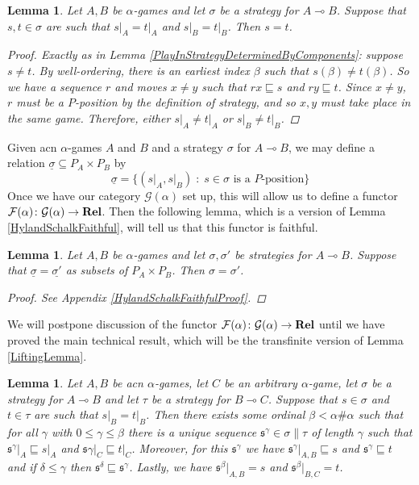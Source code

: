 \documentclass[11pt]{article} %
\theoremstyle{plain} %
\newtheorem{lemma}[theorem]{Lemma}
\theoremstyle{definition} %
\theoremstyle{note}
\theoremstyle{exercisestyle}
\newcommand{\catname}[1]{{\normalfont\textbf{#1}}}
\newcommand{\Rel}{\catname{Rel}}
\newcommand*\from{\colon}
\newcommand{\cmap}[3]{#1\from{}#2\to{}#3}
\renewcommand{\implies}{\multimap}
\newcommand{\G}{\mathcal G}
\newcommand{\suchthat}{\;\colon\;}
\newcommand{\F}{\mathcal F}
\newcommand{\s}{\mathfrak s}
\newcommand{\prefix}{\sqsubseteq}
\newcommand{\grel}[1]{\underline{#1}}
\renewcommand{\subset}{\subseteq}
\begin{document}
\begin{lemma}
  \label{TransPlayInStrategyDeterminedByComponents}
  Let $A,B$ be $\alpha$-games and let $\sigma$ be a strategy for $A\implies B$.  Suppose that $s,t\in\sigma$ are such that $s\vert_A=t\vert_A$ and $s\vert_B=t\vert_B$.  Then $s=t$.
  \begin{proof}
    Exactly as in Lemma \ref{PlayInStrategyDeterminedByComponents}: suppose $s\ne t$.  By well-ordering, there is an earliest index $\beta$ such that $s(\beta)\ne t(\beta)$.  So we have a sequence $r$ and moves $x\ne y$ such that $rx\prefix s$ and $ry\prefix t$.  Since $x\ne y$, $r$ must be a $P$-position by the definition of strategy, and so $x,y$ must take place in the same game.  Therefore, either $s\vert_A\ne t\vert_A$ or $s\vert_B\ne t\vert_B$.
  \end{proof}
\end{lemma}

Given acn $\alpha$-games $A$ and $B$ and a strategy $\sigma$ for $A\implies B$, we may define a relation $\grel\sigma\subset P_A\times P_B$ by
\[
  \grel\sigma = \{(s\vert_A,s\vert_B)\suchthat\textrm{$s\in\sigma$ is a $P$-position}\}
  \]
Once we have our category $\G(\alpha)$ set up, this will allow us to define a functor $\cmap{\F(\alpha)}{\G(\alpha)}{\Rel}$.  Then the following lemma, which is a version of Lemma \ref{HylandSchalkFaithful}, will tell us that this functor is faithful.

\begin{lemma}
  \label{TransHylandSchalkFaithful}
  Let $A,B$ be $\alpha$-games and let $\sigma,\sigma'$ be strategies for $A\implies B$.  Suppose that $\grel\sigma=\grel{\sigma'}$ as subsets of $P_A\times P_B$.  Then $\sigma=\sigma'$.
  \begin{proof}
    See Appendix \ref{HylandSchalkFaithfulProof}.
  \end{proof}
\end{lemma}

We will postpone discussion of the functor $\cmap{\F(\alpha)}{\G(\alpha)}{\Rel}$ until we have proved the main technical result, which will be the transfinite version of Lemma \ref{LiftingLemma}.  

\begin{lemma}
  \label{TransLiftingLemma}
  Let $A,B$ be acn $\alpha$-games, let $C$ be an arbitrary $\alpha$-game, let $\sigma$ be a strategy for $A\implies B$ and let $\tau$ be a strategy for $B\implies C$.  Suppose that $s\in\sigma$ and $t\in\tau$ are such that $s\vert_B=t\vert_B$.  Then there exists some ordinal $\beta<\alpha\#\alpha$ such that for all $\gamma$ with $0\le\gamma\le\beta$ there is a unique sequence $\s^\gamma\in\sigma\|\tau$ of length $\gamma$ such that $\s^\gamma\vert_A\prefix s\vert_A$ and $\s\gamma\vert_C\prefix t\vert_C$.  Moreover, for this $\s^\gamma$ we have $\s^\gamma\vert_{A,B}\prefix s$ and $\s^\gamma\prefix t$ and if $\delta\le\gamma$ then $\s^\delta\prefix\s^\gamma$.  Lastly, we have $\s^\beta\vert_{A,B}=s$ and $\s^\beta\vert_{B,C}=t$.
\end{lemma}
\end{document}
